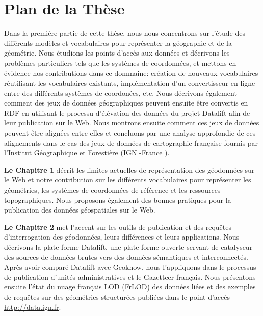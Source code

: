 \section*{Plan de la Th\`{e}se}
\label{sec:thesis-structure}
Dans la premi\`{e}re partie de cette th\`{e}se, nous nous concentrons sur l'\'{e}tude des diff\'{e}rents mod\`{e}les et vocabulaires pour repr\'{e}senter la g\'{e}ographie et de la g\'{e}om\'{e}trie. Nous \'{e}tudions les points d'acc\`{e}s aux donn\'{e}es et d\'{e}crivons les probl\`{e}mes particuliers tels que les syst\`{e}mes de coordonn\'{e}es, et mettons en \'{e}vidence nos contributions dans ce dommaine: cr\'{e}ation de nouveaux vocabulaires r\'{e}utilisant les vocabulaires existants, impl\'{e}mentation d'un convertisseur en ligne entre des diff\'{e}rents syst\`{e}mes de coordon\'{e}es, etc. Nous d\'{e}crivons \'{e}galement comment des jeux de donn\'{e}es g\'{e}ographiques peuvent ensuite \^{e}tre convertis en RDF en utilisant le processu d'\'{e}l\'{e}vation des donn\'{e}es du projet Datalift afin de leur publication sur le Web. Nous montrons ensuite comment ces jeux de donn\'{e}es peuvent \^{e}tre align\'{e}es entre elles et concluons par une analyse approfondie de ces alignements dans le cas des jeux de donn\'{e}es de cartographie française fournis par l'Institut G\'{e}ographique et Foresti\`{e}re (IGN -France ).

\textbf{Le Chapitre 1} d\'{e}crit les limites actuelles de repr\'{e}sentation des g\'{e}odonn\'{e}es sur le Web et notre contribution sur les diff\'{e}rents vocabulaires pour repr\'{e}senter les g\'{e}om\'{e}tries, les syst\`{e}mes de coordonn\'{e}es de r\'{e}f\'{e}rence et les ressources topographiques. Nous proposons \'{e}galement des bonnes pratiques pour la publication des donn\'{e}es g\'{e}ospatiales sur le Web.

\textbf{Le Chapitre 2} met l'accent sur les outils de publication et des requ\^{e}tes d'interrogation des g\'{e}odonn\'{e}es, leurs diff\'{e}rences et leurs applications. Nous d\'{e}crivons la plate-forme Datalift, une plate-forme ouverte servant de catalyseur des sources de donn\'{e}es brutes vers des donn\'{e}es s\'{e}mantiques et interconnect\'{e}s. Apr\`{e}s avoir compar\'{e} Datalift avec Geoknow, nous l'appliquons dans le processus de publication d'unit\'{e}s administratives et le Gazetteer français. Nous pr\'{e}sentons ensuite l'\'{e}tat du nuage français LOD (FrLOD) des donn\'{e}es li\'{e}es et des exemples de requ\^{e}tes sur des g\'{e}om\'{e}tries structur\'{e}es publi\'{e}es dans le point d'acc\`{e}s \url{http://data.ign.fr}.

